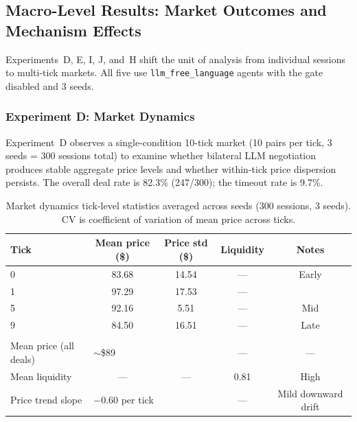 \subsection{Macro-Level Results: Market Outcomes and Mechanism Effects}
\label{sec:results-macro}

Experiments~D, E, I, J, and~H shift the unit of analysis from individual sessions to multi-tick markets.  All five use \texttt{llm\_free\_language} agents with the gate disabled and 3 seeds.

\subsubsection{Experiment D: Market Dynamics}
\label{sec:results-market}

Experiment~D observes a single-condition 10-tick market (10 pairs per tick, 3 seeds = 300 sessions total) to examine whether bilateral LLM negotiation produces stable aggregate price levels and whether within-tick price dispersion persists.  The overall deal rate is 82.3\% (247/300); the timeout rate is 9.7\%.

\begin{table}[ht]
\centering
\caption{Market dynamics tick-level statistics averaged across seeds (300 sessions, 3 seeds).  CV is coefficient of variation of mean price across ticks.}
\label{tab:market-agg}
\begin{tabular}{@{}lcccc@{}}
\toprule
Tick & Mean price (\$) & Price std (\$) & Liquidity & Notes \\
\midrule
0 & 83.68 & 14.54 & --- & Early \\
1 & 97.29 & 17.53 & --- & \\
5 & 92.16 & 5.51  & --- & Mid \\
9 & 84.50 & 16.51 & --- & Late \\
\addlinespace
\multicolumn{5}{@{}l}{\textit{Aggregate (all 10 ticks)}} \\
Mean price (all deals) & \multicolumn{2}{l}{$\sim$\$89} & --- & --- \\
Mean liquidity & --- & --- & 0.81 & High \\
Price trend slope & \multicolumn{2}{l}{$-$0.60 per tick} & --- & Mild downward drift \\
\bottomrule
\end{tabular}
\end{table}

